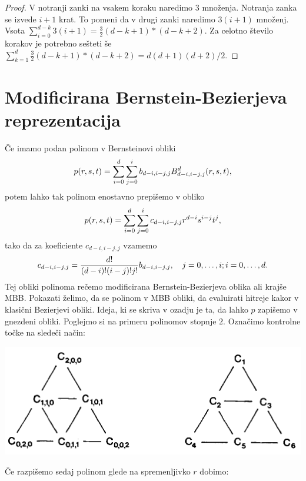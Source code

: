 \documentclass{article}
\begin{document}
\begin{proof}
V notranji zanki na vsakem koraku naredimo $3$ množenja. Notranja zanka se izvede $i+1$ krat. To pomeni da v drugi zanki naredimo $3(i+1)$ množenj. Vsota $\sum_{i=0}^{d-k}3(i+1) = \frac{3}{2}(d-k+1)*(d-k+2)$. Za celotno število korakov je potrebno sešteti še $\sum_{k=1}^{d}\frac{3}{2}(d-k+1)*(d-k+2) = d(d+1)(d+2)/2$.
\end{proof}



\section{Modificirana Bernstein-Bezierjeva reprezentacija}

Če imamo podan polinom v Bernsteinovi obliki $$p(r,\\s,\\t) = \sum_{i=0}^{d}\sum_{j=0}^{i}b_{d-i,i-j,j}B_{d-i,i-j,j}^d(r,\\s,\\t),$$
potem lahko tak polinom enostavno prepišemo v obliko
$$p(r,\\s,\\t) = \sum_{i=0}^{d}\sum_{j=0}^{i}c_{d-i,i-j,j}r^{d-i}s^{i-j}t^j,$$
tako da za koeficiente $c_{d-i,i-j,j}$ vzamemo
$$c_{d-i,i-j,j} = \frac{d!}{(d-i)!(i-j)!j!}b_{d-i,i-j,j}, \quad j=0,\ldots, i;\\ i = 0,\ldots,d.$$
Tej obliki polinoma rečemo modificirana Bernstein-Bezierjeva oblika ali krajše MBB. Pokazati želimo, da se polinom v MBB obliki, da evaluirati hitreje kakor v klasični Bezierjevi obliki. Ideja, ki se skriva v ozadju je ta, da lahko $p$ zapišemo v gnezdeni obliki. Poglejmo si na primeru polinomov stopnje $2$. Označimo kontrolne točke na sledeči način:

\begin{center}
\includegraphics[width=.9\linewidth]{graf.png}
\end{center}

Če razpišemo sedaj polinom glede na spremenljivko $r$ dobimo:
\end{document}
